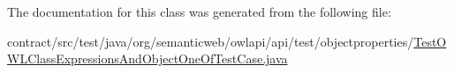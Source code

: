 The documentation for this class was generated from the following file\-:\begin{DoxyCompactItemize}
\item 
contract/src/test/java/org/semanticweb/owlapi/api/test/objectproperties/\hyperlink{_test_o_w_l_class_expressions_and_object_one_of_test_case_8java}{Test\-O\-W\-L\-Class\-Expressions\-And\-Object\-One\-Of\-Test\-Case.\-java}\end{DoxyCompactItemize}
